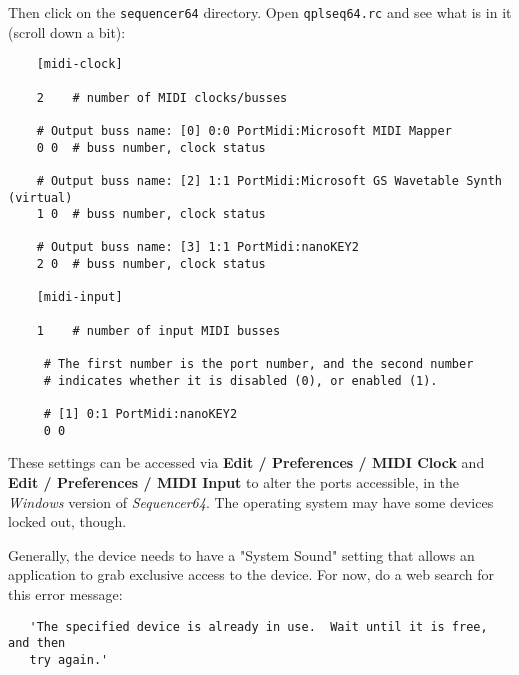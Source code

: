     Then click on the \texttt{sequencer64} directory.
    Open \texttt{qplseq64.rc} and see what is in it (scroll down a bit):

\begin{verbatim}
    [midi-clock]

    2    # number of MIDI clocks/busses

    # Output buss name: [0] 0:0 PortMidi:Microsoft MIDI Mapper
    0 0  # buss number, clock status

    # Output buss name: [2] 1:1 PortMidi:Microsoft GS Wavetable Synth (virtual)
    1 0  # buss number, clock status

    # Output buss name: [3] 1:1 PortMidi:nanoKEY2
    2 0  # buss number, clock status
    
    [midi-input]
    
    1    # number of input MIDI busses

	 # The first number is the port number, and the second number
	 # indicates whether it is disabled (0), or enabled (1).

	 # [1] 0:1 PortMidi:nanoKEY2
	 0 0
\end{verbatim}

   These settings can be accessed via
   \textbf{Edit / Preferences / MIDI Clock} and
   \textbf{Edit / Preferences / MIDI Input} to
	alter the ports accessible, in the \textsl{Windows}
   version of \textsl{Sequencer64}.
   The operating system may have some devices locked out, though.

   Generally, the device needs to have a "System Sound" setting that allows an
   application to grab exclusive access to the device.
   For now, do a web search for this error message:

\begin{verbatim}
   'The specified device is already in use.  Wait until it is free, and then
   try again.'
\end{verbatim}

